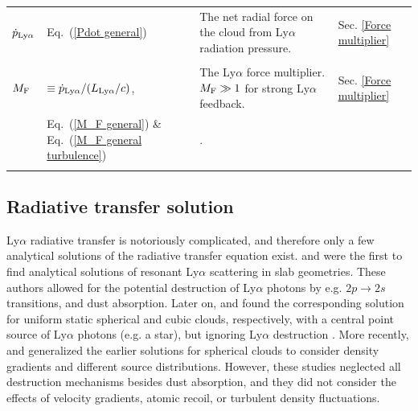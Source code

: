 \documentclass[fleqn,usenatbib]{mnras}
\begin{document}
\begin{table}
\begin{tabular}{l l l l }
  $\Dot{p}_{\rm Ly\alpha}$ &  Eq.~(\ref{Pdot general})  &  The net radial force on the cloud from Ly$\alpha$ radiation pressure. & Sec. \ref{Force multiplier} \\ 

  \\

  $M_{\rm F}$ &  $\equiv \Dot{p}_{\rm Ly\alpha}/(L_{\rm Ly\alpha}/c)$, & The Ly$\alpha$ force multiplier. $M_{\rm F} \gg 1$ for strong Ly$\alpha$ feedback. & Sec. \ref{Force multiplier} \\ 

   &  Eq.~(\ref{M_F general}) \& Eq.~(\ref{M_F general turbulence}) & . & \\ 

 
 \\
 
\hline
\hline
\end{tabular}

\label{TableSymbols}
\end{table}


\subsection{Radiative transfer solution}
\label{Solution}

Ly$\alpha$ radiative transfer is notoriously complicated, and therefore only a few analytical solutions of the radiative transfer equation exist. \cite{Harrington1973} \citep[building on work by][]{Unno1955} and \cite{Neufeld1990} were the first to find analytical solutions of resonant Ly$\alpha$ scattering in slab geometries. These authors allowed for the potential destruction of Ly$\alpha$ photons by e.g. $2p \rightarrow 2s$ transitions, and dust absorption. Later on, \cite{Dijkstra2006} and \cite{Tasitsiomi2006} found the corresponding solution for uniform static spherical and cubic clouds, respectively, with a central point source of Ly$\alpha$ photons (e.g. a star), but ignoring Ly$\alpha$ destruction \citep[see also e.g.][]{Seon2020, McClellan2022}. More recently, \cite{Lao2020} and \cite{Tomaselli2021} generalized the earlier solutions for spherical clouds to consider density gradients and different source distributions. However, these studies neglected all destruction mechanisms besides dust absorption, and they did not consider the effects of velocity gradients, atomic recoil, or turbulent density fluctuations.
\end{document}
